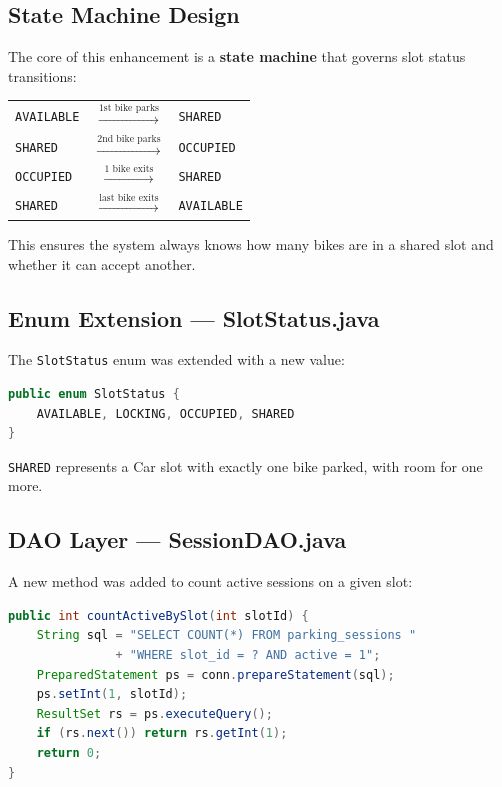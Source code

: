 \documentclass[12pt,a4paper]{article}
\begin{document}
\subsection{State Machine Design}
The core of this enhancement is a \textbf{state machine} that governs slot status transitions:

\begin{center}
\begin{tabular}{lcl}
\texttt{AVAILABLE} & $\xrightarrow{\text{1st bike parks}}$ & \texttt{SHARED} \\
\texttt{SHARED} & $\xrightarrow{\text{2nd bike parks}}$ & \texttt{OCCUPIED} \\
\texttt{OCCUPIED} & $\xrightarrow{\text{1 bike exits}}$ & \texttt{SHARED} \\
\texttt{SHARED} & $\xrightarrow{\text{last bike exits}}$ & \texttt{AVAILABLE} \\
\end{tabular}
\end{center}

This ensures the system always knows how many bikes are in a shared slot and whether it can accept another.

\subsection{Enum Extension — SlotStatus.java}
The \texttt{SlotStatus} enum was extended with a new value:

\begin{lstlisting}[language=Java, caption={SlotStatus Enum (Enhanced)}]
public enum SlotStatus { 
    AVAILABLE, LOCKING, OCCUPIED, SHARED 
}
\end{lstlisting}

\texttt{SHARED} represents a Car slot with exactly one bike parked, with room for one more.

\subsection{DAO Layer — SessionDAO.java}
A new method was added to count active sessions on a given slot:

\begin{lstlisting}[language=Java, caption={countActiveBySlot Method}]
public int countActiveBySlot(int slotId) {
    String sql = "SELECT COUNT(*) FROM parking_sessions "
               + "WHERE slot_id = ? AND active = 1";
    PreparedStatement ps = conn.prepareStatement(sql);
    ps.setInt(1, slotId);
    ResultSet rs = ps.executeQuery();
    if (rs.next()) return rs.getInt(1);
    return 0;
}
\end{lstlisting}
\end{document}
